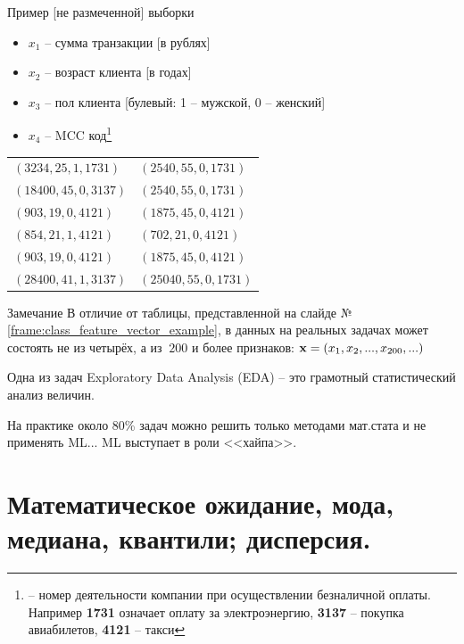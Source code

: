   \begin{frame}{Пример [не размеченной] выборки}\label{frame:class_feature_vector_example}
	\begin{itemize}
		\item $x_1$ -- сумма транзакции [в рублях]
		\item $x_2$ -- возраст клиента [в годах]
		\item $x_3$ -- пол клиента [булевый: 1 -- мужской, 0 -- женский]
		\item $x_4$ -- MCC код\footnote{ -- номер деятельности компании при осуществлении безналичной оплаты. Например \textbf{1731} означает оплату за электроэнергию, \textbf{3137} -- покупка авиабилетов, \textbf{4121} -- такси}
	\end{itemize}
	\begin{center}\small \begin{tabular}{ l l }
			$(3234, 25, 1, 1731) $ &  $(2540, 55, 0, 1731)$ \\
			$(18400, 45, 0, 3137)$ & $(2540, 55, 0, 1731)$  \\
			$(903, 19, 0, 4121)$  & $(1875, 45, 0, 4121)$  \\
			$(854, 21, 1, 4121)$  & $(702, 21, 0, 4121)$  \\
			$(903, 19, 0, 4121)$  & $(1875, 45, 0, 4121)$  \\
			$(28400, 41, 1, 3137)$ & $(25040, 55, 0, 1731)$  \\
	\end{tabular}\end{center}
\end{frame}

 \begin{frame}
	\begin{block}{Замечание}
		В отличие от таблицы, представленной на слайде №\ref{frame:class_feature_vector_example},
		в данных на реальных задачах  может состоять не из четырёх, а из $~200$ и более признаков:
		$\bold x = (x_1, x_2, ..., x_{200}, ...)$
	\end{block}

	Одна из задач Exploratory Data Analysis (EDA) -- это грамотный статистический анализ величин.
	
	На практике около 80\% задач можно решить только методами мат.стата и не применять ML... 
	ML выступает в роли <<хайпа>>. 

\end{frame}


\section{Математическое ожидание, мода, медиана, квантили; дисперсия.}\label{section:base_statistic}

